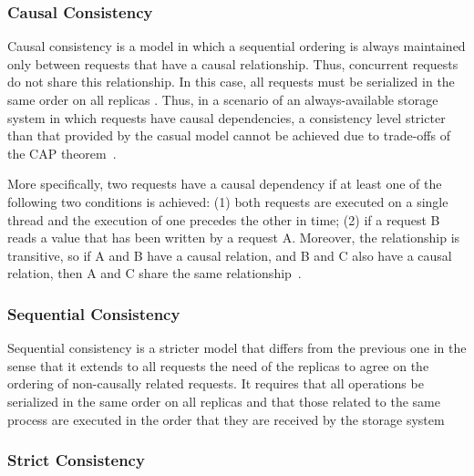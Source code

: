 \subsubsection{Causal Consistency}

Causal consistency is a model in which a sequential ordering is always maintained only between requests that have a causal relationship. Thus, concurrent requests do not share this relationship. In this case, all requests must be serialized in the same order on all replicas \cite{tanenbaum:2007}. {\al Thus, in a scenario of an always-available storage system in which requests have causal dependencies, a consistency level stricter than that provided by the casual model} cannot be achieved due to trade-offs of the CAP theorem~\cite{mahajan2011consistency}.

{\al More specifically,} two requests have a causal dependency if at least one of the following two conditions is achieved: (1) both requests are executed on a single thread and the execution of one precedes the other in time; (2) if a request B reads a value that has been written by a request A. Moreover, the relationship is transitive, so if A and B have a causal relation, and B and C also have a causal relation, then A and C share the same relationship~\cite{tanenbaum:2007, Vogels:2009}.
\vspace{1mm}

\subsubsection{Sequential Consistency}

Sequential consistency is a stricter  model that differs from the previous one in the sense that it extends to all requests %
the need of the replicas to agree on the ordering of non-causally related requests. It requires  that all operations be serialized in the same order on all replicas and that those related to the same process are executed in the order that they are received by the storage system~\cite{tanenbaum:2007}

\subsubsection{Strict Consistency}

